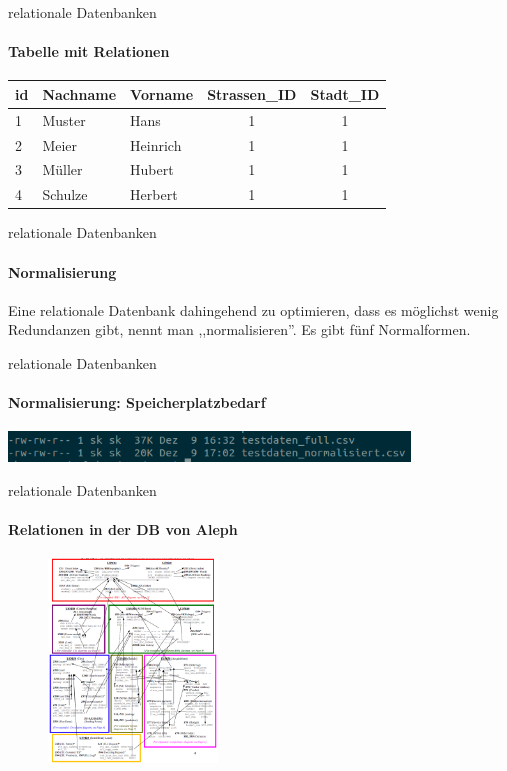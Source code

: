 \begin{frame}{relationale Datenbanken}
\framesubtitle{Tabelle mit Relationen}
  \begin{center}
    \begin{tabular}{lllcc}
      id & Nachname & Vorname & Strassen\_ID & Stadt\_ID\\
      \hline
      1 & Muster & Hans & 1 & 1\\
      2 & Meier & Heinrich & 1 & 1\\
      3 & Müller & Hubert & 1 & 1\\
      4 & Schulze & Herbert & 1 & 1\\
    \end{tabular}
  \end{center}
\end{frame}
%
\begin{frame}{relationale Datenbanken}
\framesubtitle{Normalisierung}
  Eine relationale Datenbank dahingehend zu optimieren, dass es möglichst wenig Redundanzen gibt, nennt man ,,normalisieren''. Es gibt fünf Normalformen.
\end{frame}
%
\begin{frame}{relationale Datenbanken}
\framesubtitle{Normalisierung: Speicherplatzbedarf}
  \begin{center}
    \includegraphics[width=0.8\textwidth]{pics/speicherplatzbedarf}
  \end{center}
\end{frame}
      

\begin{frame}{relationale Datenbanken}
\framesubtitle<presentation>{Relationen in der DB von Aleph}
  \begin{figure}
    \begin{center}
      \includegraphics[width=0.4\textwidth]{pics/alephtables}
      \end{center}
    \end{figure}
\end{frame}

